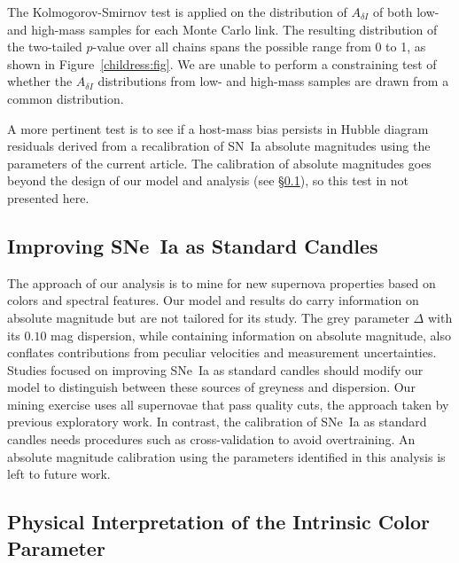 \documentclass{aastex61}   	%
\begin{document}
The Kolmogorov-Smirnov test is applied on the distribution of $A_{\delta I}$ of both low- and high-mass samples for
each Monte Carlo link.  The resulting distribution of the two-tailed $p$-value  over all chains spans the possible range from 0 to 1, as shown in Figure~\ref{childress:fig}.  We are unable to perform a constraining test of whether the $A_{\delta I}$ distributions from low- and high-mass samples
are drawn from a common distribution.

A more pertinent test is to see if a host-mass bias persists in Hubble diagram residuals
derived from a recalibration of SN~Ia absolute magnitudes using the parameters of the current article.
The calibration of absolute magnitudes goes beyond the design of our model and analysis (see \S\ref{standard:sec}), so this test
in not presented here.

\subsection{Improving SNe~Ia as Standard Candles}
\label{standard:sec}
The approach of our analysis is to mine for new supernova properties based on colors and spectral features.
Our model and results do carry information on absolute magnitude but are not tailored for its study.
The grey parameter $\Delta$ with its $0.10$ mag dispersion, while containing information on absolute magnitude, 
also conflates
contributions from peculiar velocities and measurement uncertainties.  Studies
focused on improving SNe~Ia as standard candles should modify  our model to
distinguish between these sources of greyness and dispersion.
Our
mining exercise uses all supernovae that pass quality cuts, the approach taken by previous
exploratory work.  In contrast, the calibration of SNe~Ia as standard candles needs procedures such
as cross-validation to avoid overtraining.
An absolute magnitude calibration using the parameters identified in this analysis is left to future work.


\subsection{Physical Interpretation of the Intrinsic Color Parameter}
\end{document}
